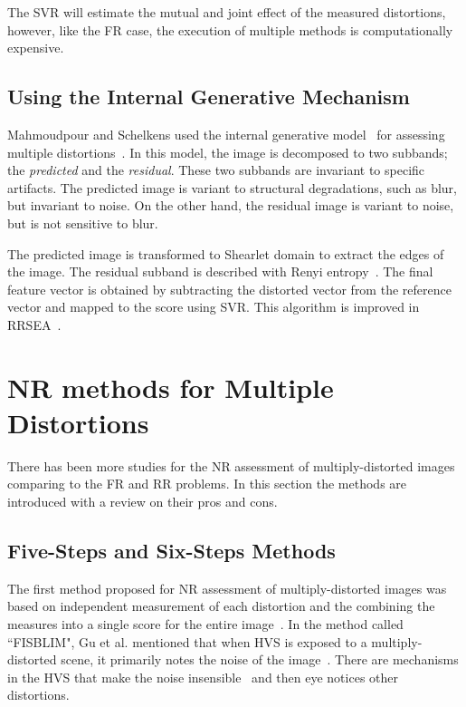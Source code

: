The SVR will estimate the mutual and joint effect of the measured distortions, however, like the FR case, the execution of multiple methods is computationally expensive.
\subsection{Using the Internal Generative Mechanism}
Mahmoudpour and Schelkens used the internal generative model~\cite{Friston2010} for assessing multiple
distortions~\cite{Mahmoudpour2017}. In this model, the image is decomposed to two subbands; the \emph{predicted} and the \emph{residual}. These two subbands are invariant to specific artifacts. The predicted image is variant to structural degradations, such as blur, but invariant to noise. On the other hand, the residual image is variant to noise, but is not sensitive to blur.

The predicted image is transformed to Shearlet domain to extract the edges of the image. The residual subband is described with Renyi entropy~\cite{Gabarda2007}. The final feature vector is obtained by subtracting the distorted vector from the reference vector and mapped to the score using SVR. This algorithm is improved in RRSEA~\cite{Mahmoudpour2018}. 
\section{NR methods for Multiple Distortions}
There has been more studies for the NR assessment of multiply-distorted images comparing to the FR and RR problems. In this section the methods are introduced with a review on their pros and cons.
\subsection{Five-Steps and Six-Steps Methods}
The first method proposed for NR assessment of multiply-distorted images was based on independent measurement of each distortion and the combining the measures into a single score for the entire image~\cite{Gu2013}. In the method called ``FISBLIM", Gu et al. mentioned that when HVS is exposed to a multiply-distorted scene, it primarily notes the noise of the image~\cite{Gonzalez2008}. There are mechanisms in the HVS that make the noise insensible~\cite{Dabov2007} and then eye notices other distortions.

